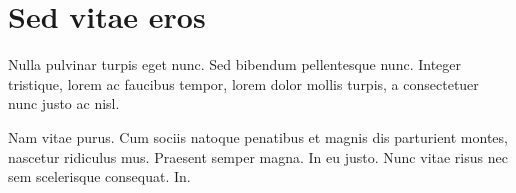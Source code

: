 \documentclass[../hdr.tex]{subfiles}
\begin{document}
\section{Sed vitae eros}

Nulla pulvinar turpis eget nunc. Sed bibendum
pellentesque nunc. Integer tristique, lorem ac faucibus tempor, lorem dolor
mollis turpis, a consectetuer nunc justo ac nisl.

Nam vitae purus. Cum sociis natoque penatibus et magnis dis parturient montes,
nascetur ridiculus mus. Praesent semper magna. In eu justo. Nunc vitae risus nec
sem scelerisque consequat. In.

\ifSubfilesClassLoaded{%
\printbibliography
}{%
  \vskip2cm
}
\end{document}
